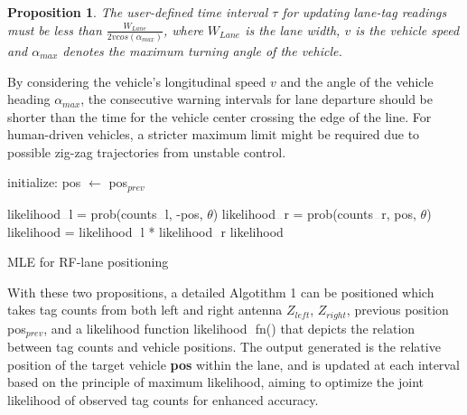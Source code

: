 \documentclass[lettersize,journal]{IEEEtran}
\newtheorem{prop}{Proposition}
\begin{document}
\begin{prop}\label{prop_max_tau}
The user-defined time interval $\tau$ for updating lane-tag readings must be less than $\frac{W_{Lane}}{2vcos(\alpha_{max})}$, where $W_{Lane}$ is the lane width, $v$ is the vehicle speed and $\alpha_{max}$ denotes the maximum turning angle of the vehicle. 
\end{prop}

By considering the vehicle's longitudinal speed $v$ and the angle of the vehicle heading $\alpha_{max}$, the consecutive warning intervals for lane departure should be shorter than the time for the vehicle center crossing the edge of the line. For human-driven vehicles, a stricter maximum limit might be required due to possible zig-zag trajectories from unstable control.


\begin{algorithm}
 \nl   initialize:  pos $\leftarrow$ pos$_{prev}$\;

 \nl {}
 \newline
\begin{algorithmic}
  \State likelihood$\rule{0.2cm}{0.02mm}$l = prob(counts$\rule{0.2cm}{0.02mm}$l, -pos, $\theta$)\;
  \State likelihood$\rule{0.2cm}{0.02mm}$r = prob(counts$\rule{0.2cm}{0.02mm}$r, pos, $\theta$)\;
  \State likelihood = likelihood$\rule{0.2cm}{0.02mm}$l * likelihood$\rule{0.2cm}{0.02mm}$r
  \State \Return likelihood
\EndFunction
\end{algorithmic}
 \caption{MLE for RF-lane positioning~\cite{suo2023rf}}
 
\end{algorithm}

With these two propositions, a detailed Algotithm 1 can be positioned which takes tag counts from both left and right antenna $Z_{left}$, $Z_{right}$, previous position pos$_{prev}$, and a likelihood function likelihood$\rule{0.2cm}{0.02mm}$fn() that depicts the relation between tag counts and vehicle positions. The output generated is the relative position of the target vehicle \textbf{pos} within the lane, and is updated at each interval based on the principle of maximum likelihood, aiming to optimize the joint likelihood of observed tag counts for enhanced accuracy.
\end{document}
